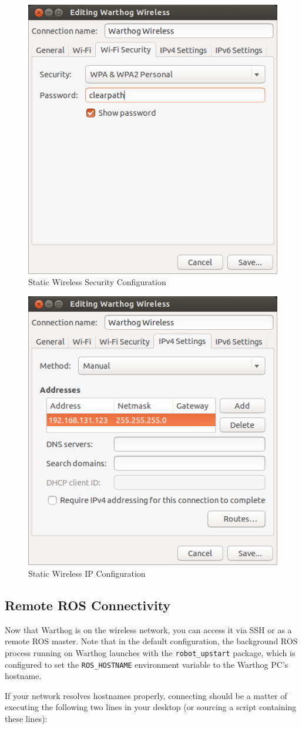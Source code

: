 \documentclass[]{clearpath-latex/clearpath-manual}
\begin{document}
\begin{figure}[H]
  \centering
  \includegraphics[width=0.5\linewidth]{wifi-security.png}
  \caption{Static Wireless Security Configuration}
  \label{wifi-security}
\end{figure}

\begin{figure}[H]
  \centering
  \includegraphics[width=0.5\linewidth]{wifi-ip.png}
  \caption{Static Wireless IP Configuration}
  \label{wifi-ip}
\end{figure}

\subsection{Remote ROS Connectivity}

Now that Warthog is on the wireless network, you can access it via SSH or as a remote ROS master. Note that in the default configuration, the background ROS process running on Warthog launches with the \lstinline{robot_upstart} package, which is configured to set the \lstinline{ROS_HOSTNAME} environment variable to the Warthog PC's hostname.

If your network resolves hostnames properly, connecting should be a matter of executing the following two lines in your desktop (or sourcing a script containing these lines):
\end{document}
